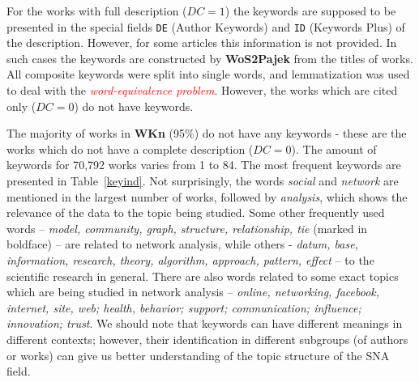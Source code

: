 \documentclass[11pt]{article} %
\newcommand{\keyw}[1]{\textcolor{red}{\emph{#1}}}
\begin{document}
For the works with full description ($DC=1$) the keywords are supposed to be presented in the special fields \texttt {DE} (Author Keywords) and \texttt {ID} (Keywords Plus) of the description. However, for some articles this information is not provided. In such cases the keywords are constructed by \textbf{WoS2Pajek} from the titles of works. All composite keywords were split into single words, and lemmatization was used to deal with the \keyw{word-equivalence problem}. However, the works which are cited only ($DC=0$) do not have keywords. \medskip

The majority of works in \textbf{WKn} (95\%) do not have any keywords - these are the works which do not have a complete description ($DC=0$). The amount of keywords for 70,792 works varies from 1 to 84. The most frequent keywords are presented in Table~\ref{keyind}. Not surprisingly, the words \textit{social} and \textit{network} are mentioned in the largest number of works, followed by \textit{analysis}, which shows the relevance of the data to the topic being studied. Some other frequently used words -- \textit{model, community, graph, structure, relationship, tie} (marked in boldface) -- are related to network analysis, while others - \textit{datum, base, information, research, theory, algorithm, approach, pattern, effect} -- to the scientific research in general. There are also words related to some exact topics which are being studied in network analysis -- \textit{online,  networking, facebook, internet, site, web; health, behavior; support; communication; influence; innovation; trust}. We should note that keywords can have different meanings in different contexts; however, their identification in different subgroups (of authors or works) can give us better understanding of the topic structure of the SNA field. \medskip
\end{document}
